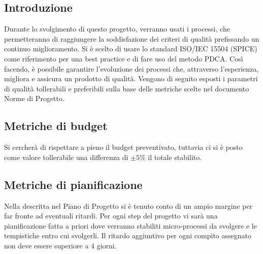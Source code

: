 \documentclass[../piano_di_qualifica.tex]{subfiles}
\begin{document}
\subsection{Introduzione}
Durante lo svolgimento di questo progetto, verranno usati i processi, che permetteranno di raggiungere la soddisfazione dei criteri di qualità prefissando un continuo miglioramento. Si è scelto di usare lo standard ISO/IEC 15504 (SPICE) come riferimento per una best practice e di fare uso del metodo PDCA. Così facendo, è possibile garantire l'evoluzione dei processi che, attraverso l'esperienza, migliora e assicura un prodotto di qualità. Vengono di seguito esposti i parametri di qualità tollerabili e preferibili sulla base delle metriche scelte nel documento Norme di Progetto.

\subsection{Metriche di budget}
\label{sub:metr_bud}
Si cercherà di rispettare a pieno il budget preventivato, tuttavia ci si è posto come valore tollerabile una differenza di ${\pm 5\%}$ il totale stabilito.

\subsection{Metriche di pianificazione}
\label{sub: metr_pianif}
Nella  descritta nel Piano di Progetto si è tenuto conto di un ampio margine per far fronte ad eventuali ritardi. Per ogni step del progetto vi sarà una pianificazione fatta a priori dove verranno stabiliti micro-processi da svolgere e le tempistiche entro cui svolgerli. Il ritardo aggiuntivo per ogni compito assegnato non deve essere superiore a 4 giorni. 

\end{document}
